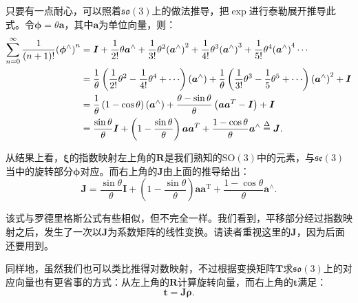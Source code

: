 只要有一点耐心，可以照着$\mathfrak{so}(3)$上的做法推导，把$\exp$进行泰勒展开推导此式。令$\boldsymbol{\phi}=\theta \bm{a}$，其中$\bm{a}$为单位向量，则：
\begin{equation}
	\begin{aligned}
		\sum\limits_{n = 0}^\infty  {\frac{1}{{\left( {n + 1} \right)!}}{{\left( {{\boldsymbol{\phi} ^ \wedge }} \right)}^n}} &= \bm{I} + \frac{1}{{2!}}\theta {\bm{a}^ \wedge } + \frac{1}{{3!}}{\theta ^2}{\left( {{\bm{a}^ \wedge }} \right)^2} + \frac{1}{{4!}}{\theta ^3}{\left( {{\bm{a}^ \wedge }} \right)^3} + \frac{1}{{5!}}{\theta ^4}{\left( {{\bm{a}^ \wedge }} \right)^4} \cdots \\
		&= \frac{1}{\theta }\left( {\frac{1}{{2!}}{\theta ^2} - \frac{1}{{4!}}{\theta ^4} +  \cdots } \right)\left( {{\bm{a}^ \wedge }} \right) + \frac{1}{\theta }\left( {\frac{1}{{3!}}{\theta ^3} - \frac{1}{5}{\theta ^5} + \cdots } \right){\left( {{\bm{a}^ \wedge }} \right)^2} + \bm{I}\\
		&= \frac{1}{\theta }\left( {1 - \cos \theta } \right)\left( {{\bm{a}^ \wedge }} \right) + \frac{{\theta  - \sin \theta }}{\theta }\left( {\bm{a}{\bm{a}^T} - \bm{I}} \right) + \bm{I}\\
		&= \frac{{\sin \theta }}{\theta }\bm{I} + \left( {1 - \frac{{\sin \theta }}{\theta }} \right)\bm{a}{\bm{a}^T} + \frac{{1 - \cos \theta }}{\theta }{\bm{a}^ \wedge } \buildrel \Delta \over = \bm{J}.
	\end{aligned}
\end{equation}

从结果上看，$\bm{\xi}$的指数映射左上角的$\bm{R}$是我们熟知的$\mathrm{SO}(3)$中的元素，与$\mathfrak{se}(3)$当中的旋转部分$\bm{\phi}$对应。而右上角的$\bm{J}$由上面的推导给出：
\begin{equation}
\label{eq:lieAlgebraJacobian}
\bm{J} = \frac{{\sin \theta }}{\theta } \bm{I} + \left( {1 - \frac{{\sin \theta }}{\theta }} \right) \bm{a} { \bm{a}^\mathrm{T}} + \frac{{1 - \cos \theta }}{\theta }{ \bm{a}^ \wedge }.
\end{equation}

该式与罗德里格斯公式有些相似，但不完全一样。我们看到，平移部分经过指数映射之后，发生了一次以$\bm{J}$为系数矩阵的线性变换。请读者重视这里的$\bm{J}$，因为后面还要用到。

同样地，虽然我们也可以类比推得对数映射，不过根据变换矩阵$\bm{T}$求$\mathfrak{so}(3)$上的对应向量也有更省事的方式：从左上角的$\bm{R}$计算旋转向量，而右上角的$\bm{t}$满足：
\begin{equation}
	\bm{t} = \bm{J} \bm{\rho}.
\end{equation}

